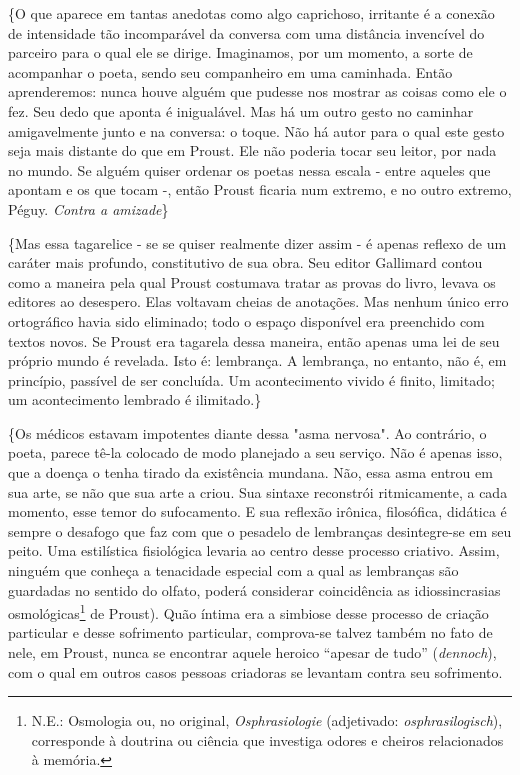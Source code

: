 \{O que aparece em tantas anedotas como algo caprichoso, irritante é a
conexão de intensidade tão incomparável da conversa com uma distância
invencível do parceiro para o qual ele se dirige. Imaginamos, por um
momento, a sorte de acompanhar o poeta, sendo seu companheiro em uma
caminhada. Então aprenderemos: nunca houve alguém que pudesse nos
mostrar as coisas como ele o fez. Seu dedo que aponta é inigualável. Mas
há um outro gesto no caminhar amigavelmente junto e na conversa: o
toque. Não há autor para o qual este gesto seja mais distante do que em
Proust. Ele não poderia tocar seu leitor, por nada no mundo. Se alguém
quiser ordenar os poetas nessa escala - entre aqueles que apontam e os
que tocam -, então Proust ficaria num extremo, e no outro extremo,
Péguy. \emph{Contra a amizade}\}

\{Mas essa tagarelice - se se quiser realmente dizer assim - é apenas
reflexo de um caráter mais profundo, constitutivo de sua obra. Seu
editor Gallimard contou como a maneira pela qual Proust costumava tratar
as provas do livro, levava os editores ao desespero. Elas voltavam
cheias de anotações. Mas nenhum único erro ortográfico havia sido
eliminado; todo o espaço disponível era preenchido com textos novos. Se
Proust era tagarela dessa maneira, então apenas uma lei de seu próprio
mundo é revelada. Isto é: lembrança. A lembrança, no entanto, não é, em
princípio, passível de ser concluída. Um acontecimento vivido é finito,
limitado; um acontecimento lembrado é ilimitado.\}

\{Os médicos estavam impotentes diante dessa "asma nervosa". Ao
contrário, o poeta, parece tê-la colocado de modo planejado a seu
serviço. Não é apenas isso, que a doença o tenha tirado da existência
mundana. Não, essa asma entrou em sua arte, se não que sua arte a criou.
Sua sintaxe reconstrói ritmicamente, a cada momento, esse temor do
sufocamento. E sua reflexão irônica, filosófica, didática é sempre o
desafogo que faz com que o pesadelo de lembranças desintegre-se em seu
peito. Uma estilística fisiológica levaria ao centro desse processo
criativo. Assim, ninguém que conheça a tenacidade especial com a qual as
lembranças são guardadas no sentido do olfato, poderá considerar
coincidência as idiossincrasias osmológicas\footnote{N.E.: Osmologia ou,
  no original, \emph{Osphrasiologie} (adjetivado:
  \emph{osphrasilogisch}), corresponde à doutrina ou ciência que
  investiga odores e cheiros relacionados à memória.} de Proust). Quão
íntima era a simbiose desse processo de criação particular e desse
sofrimento particular, comprova-se talvez também no fato de nele, em
Proust, nunca se encontrar aquele heroico ``apesar de tudo''
(\emph{dennoch}), com o qual em outros casos pessoas criadoras se
levantam contra seu sofrimento.

